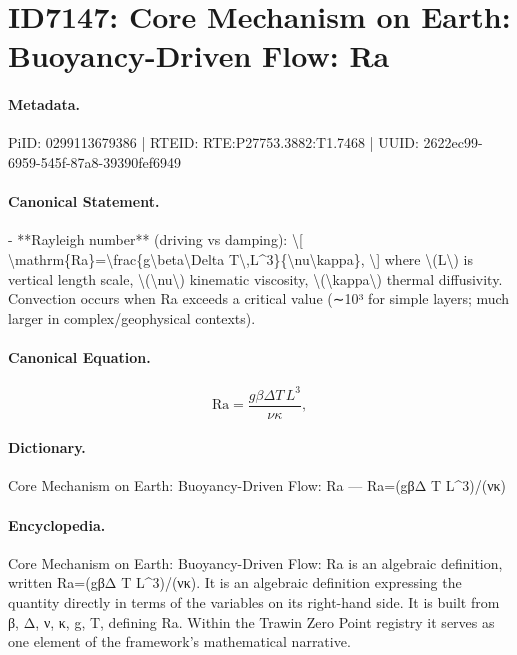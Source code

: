 \section*{ID7147: Core Mechanism on Earth: Buoyancy-Driven Flow: Ra}
\paragraph{Metadata.}
PiID: 0299113679386 | RTEID: RTE:P27753.3882:T1.7468 | UUID: 2622ec99-6959-545f-87a8-39390fef6949

\paragraph{Canonical Statement.}
- **Rayleigh number** (driving vs damping): \textbackslash{}[ \textbackslash{}mathrm\{Ra\}=\textbackslash{}frac\{g\textbackslash{}beta\textbackslash{}Delta T\textbackslash{},L\textasciicircum{}3\}\{\textbackslash{}nu\textbackslash{}kappa\}, \textbackslash{}] where \textbackslash{}(L\textbackslash{}) is vertical length scale, \textbackslash{}(\textbackslash{}nu\textbackslash{}) kinematic viscosity, \textbackslash{}(\textbackslash{}kappa\textbackslash{}) thermal diffusivity. Convection occurs when Ra exceeds a critical value (∼10³ for simple layers; much larger in complex/geophysical contexts).

\paragraph{Canonical Equation.}
\[
\mathrm{Ra}=\frac{g\beta\Delta T\,L^3}{\nu\kappa},
\]

\paragraph{Dictionary.}
Core Mechanism on Earth: Buoyancy-Driven Flow: Ra — Ra=(gβΔ T L\textasciicircum{}3)/(νκ)

\paragraph{Encyclopedia.}
Core Mechanism on Earth: Buoyancy-Driven Flow: Ra is an algebraic definition, written Ra=(gβΔ T L\textasciicircum{}3)/(νκ). It is an algebraic definition expressing the quantity directly in terms of the variables on its right-hand side. It is built from β, Δ, ν, κ, g, T, defining Ra. Within the Trawin Zero Point registry it serves as one element of the framework's mathematical narrative.
